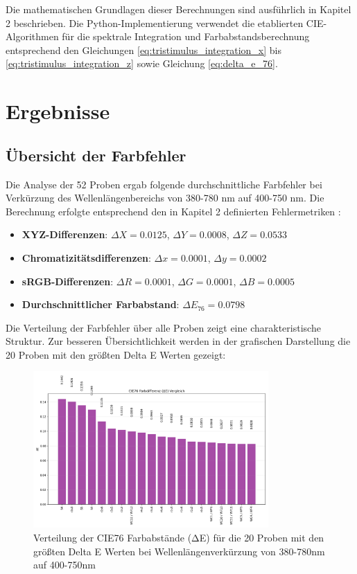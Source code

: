 Die mathematischen Grundlagen dieser Berechnungen sind ausführlich in Kapitel 2 \parencite{CIE15:2018} beschrieben. Die Python-Implementierung verwendet die etablierten CIE-Algorithmen für die spektrale Integration und Farbabstandsberechnung entsprechend den Gleichungen \ref{eq:tristimulus_integration_x} bis \ref{eq:tristimulus_integration_z} sowie Gleichung \ref{eq:delta_e_76}.

\section{Ergebnisse}

\subsection{Übersicht der Farbfehler}

Die Analyse der 52 Proben ergab folgende durchschnittliche Farbfehler bei Verkürzung des Wellenlängenbereichs von 380-780 nm auf 400-750 nm. Die Berechnung erfolgte entsprechend den in Kapitel 2 definierten Fehlermetriken \parencite{CIE15:2018}:

\begin{itemize}
    \item \textbf{XYZ-Differenzen}: $\Delta X = 0.0125$, $\Delta Y = 0.0008$, $\Delta Z = 0.0533$
    \item \textbf{Chromatizitätsdifferenzen}: $\Delta x = 0.0001$, $\Delta y = 0.0002$
    \item \textbf{sRGB-Differenzen}: $\Delta R = 0.0001$, $\Delta G = 0.0001$, $\Delta B = 0.0005$
    \item \textbf{Durchschnittlicher Farbabstand}: $\Delta E_{76} = 0.0798$
\end{itemize}

Die Verteilung der Farbfehler über alle Proben zeigt eine charakteristische Struktur. Zur besseren Übersichtlichkeit werden in der grafischen Darstellung die 20 Proben mit den größten Delta E Werten gezeigt:

\begin{figure}[htbp]
    \centering
    \includegraphics[width=0.8\textwidth]{./figures/delta_e_comparison.png}
    \caption{Verteilung der CIE76 Farbabstände (ΔE) für die 20 Proben mit den größten Delta E Werten bei Wellenlängenverkürzung von 380-780nm auf 400-750nm}
    \label{fig:delta_e_distribution}
\end{figure}

